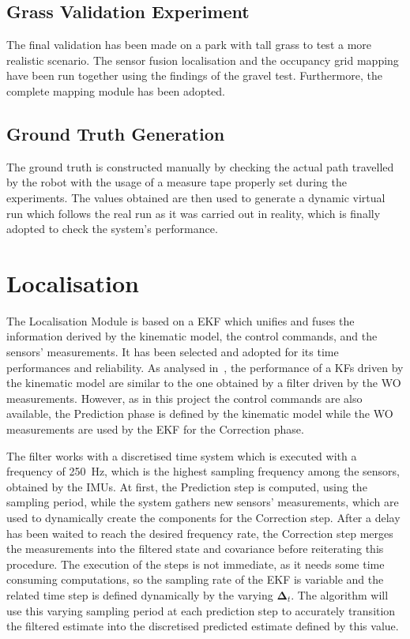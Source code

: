 \subsection{Grass Validation Experiment}
\noindent
The final validation has been made on a park with tall grass to test a more realistic scenario.
The sensor fusion localisation and the occupancy grid mapping have been run together using the findings of the gravel test.
Furthermore, the complete mapping module has been adopted. 

\subsection{Ground Truth Generation}
\label{sec:gt}
\noindent The ground truth is constructed manually by checking the actual path travelled by the robot with the usage of a measure tape properly set during the experiments.
The values obtained are then used to generate a dynamic virtual run which follows the real run as it was carried out in reality, which is finally adopted to check the system's performance.

\section{Localisation}
\label{sec:loc-method}
\noindent The Localisation Module is based on a \gls{EKF} which unifies and fuses the information derived by the kinematic model, the control commands, and the sensors' measurements.
It has been selected and adopted for its time performances and reliability.
As analysed in~\cite{801027}, the performance of a \glspl{KF} driven by the kinematic model are similar to the one obtained by a filter driven by the \gls{WO} measurements.
However, as in this project the control commands are also available, the Prediction phase is defined by the kinematic model while the \gls{WO} measurements are used by the \gls{EKF} for the Correction phase.

The filter works with a discretised time system which is executed with a frequency of \SI{250}{Hz}, which is the highest sampling frequency among the sensors, obtained by the \glspl{IMU}.
At first, the Prediction step is computed, using the sampling period, while the system gathers new sensors' measurements, which are used to dynamically create the components for the Correction step. 
After a delay has been waited to reach the desired frequency rate, the Correction step merges the measurements into the filtered state and covariance before reiterating this procedure. 
The execution of the steps is not immediate, as it needs some time consuming computations, so the sampling rate of the \gls{EKF} is variable and the related time step is defined dynamically by the varying $\boldsymbol \Delta_t$.
The algorithm will use this varying sampling period at each prediction step to accurately transition the filtered estimate into the discretised predicted estimate defined by this value. 

